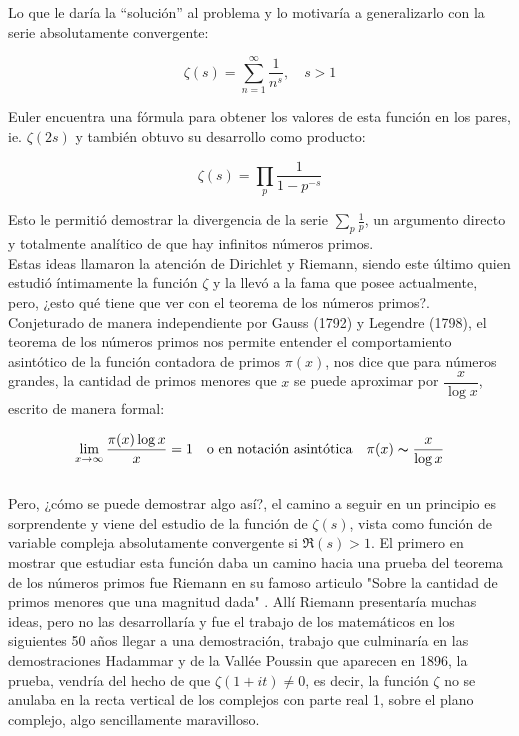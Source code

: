 Lo que le daría la ``solución'' al problema y lo motivaría a generalizarlo con la serie absolutamente convergente:

$$\zeta(s)=\sum_{n=1}^{\infty}\frac{1}{n^s}, \quad s>1$$

Euler encuentra una fórmula para obtener los valores de esta función en los pares, ie. $\zeta(2s)$ y también obtuvo su desarrollo como producto:

$$\zeta(s)=\prod_{p}\frac{1}{1-p^{-s}}$$

Esto le permitió demostrar la divergencia de la serie $\displaystyle \sum_p\frac{1}{p}$, un argumento directo y totalmente analítico de que hay infinitos números primos.\\

Estas ideas llamaron la atención de Dirichlet y Riemann, siendo este último quien estudió íntimamente la función $\zeta$ y la llevó a la fama que posee actualmente, pero, ¿esto qué tiene que ver con el teorema de los números primos?.\\

Conjeturado de manera independiente por Gauss (1792) y Legendre (1798), el teorema de los números primos nos permite entender el comportamiento asintótico de la función contadora de  primos $\pi(x)$, nos dice  que para números grandes, la cantidad de primos menores que $x$ se puede aproximar por $\dfrac{x}{\log x}$, escrito de manera formal:

$$\lim_{x \to \infty}\dfrac{\pi(x)\log x}{x}=1 \quad \text{o en notación asintótica} \quad \pi(x)\thicksim \dfrac{x}{\log x}$$\\

Pero, ¿cómo se puede demostrar algo así?, el camino a seguir en un principio es sorprendente y viene del estudio de la función de $\zeta(s)$, vista como función de variable compleja absolutamente convergente si $\Re(s)>1$. El primero en mostrar que estudiar esta función daba un camino hacia una prueba del teorema de los números primos fue Riemann en su famoso articulo "Sobre la cantidad de primos menores que una magnitud dada" \cite{riemann1990ueber}. Allí Riemann presentaría muchas ideas, pero no las desarrollaría y fue el trabajo de los matemáticos en los siguientes 50 años llegar a una demostración, trabajo que culminaría en las demostraciones Hadammar y de la Vallée Poussin que aparecen en 1896, la prueba, vendría del hecho de que $\zeta(1+it)\neq 0$, es decir, la función $\zeta$ no se anulaba en la recta vertical de los complejos con parte real 1, sobre el plano complejo, algo sencillamente maravilloso.\\

